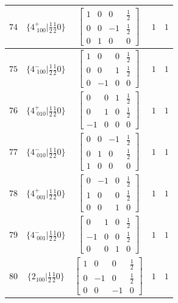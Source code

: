 \documentclass[fleqn,8pt]{jsarticle}
\begin{document}
\begin{longtable}{ccccc}
$ 74 $ & $ \{4^{+}_{\,\,100}|\frac{1}{2} \frac{1}{2} 0\} $ & $ \begin{bmatrix} 1 & 0 & 0 & \frac{1}{2} \\ 0 & 0 & -1 & \frac{1}{2} \\ 0 & 1 & 0 & 0 \end{bmatrix} $ & $ 1 $ & $ 1 $ \\ \hline
$ 75 $ & $ \{4^{-}_{\,\,100}|\frac{1}{2} \frac{1}{2} 0\} $ & $ \begin{bmatrix} 1 & 0 & 0 & \frac{1}{2} \\ 0 & 0 & 1 & \frac{1}{2} \\ 0 & -1 & 0 & 0 \end{bmatrix} $ & $ 1 $ & $ 1 $ \\ \hline
$ 76 $ & $ \{4^{+}_{\,\,010}|\frac{1}{2} \frac{1}{2} 0\} $ & $ \begin{bmatrix} 0 & 0 & 1 & \frac{1}{2} \\ 0 & 1 & 0 & \frac{1}{2} \\ -1 & 0 & 0 & 0 \end{bmatrix} $ & $ 1 $ & $ 1 $ \\ \hline
$ 77 $ & $ \{4^{-}_{\,\,010}|\frac{1}{2} \frac{1}{2} 0\} $ & $ \begin{bmatrix} 0 & 0 & -1 & \frac{1}{2} \\ 0 & 1 & 0 & \frac{1}{2} \\ 1 & 0 & 0 & 0 \end{bmatrix} $ & $ 1 $ & $ 1 $ \\ \hline
$ 78 $ & $ \{4^{+}_{\,\,001}|\frac{1}{2} \frac{1}{2} 0\} $ & $ \begin{bmatrix} 0 & -1 & 0 & \frac{1}{2} \\ 1 & 0 & 0 & \frac{1}{2} \\ 0 & 0 & 1 & 0 \end{bmatrix} $ & $ 1 $ & $ 1 $ \\ \hline
$ 79 $ & $ \{4^{-}_{\,\,001}|\frac{1}{2} \frac{1}{2} 0\} $ & $ \begin{bmatrix} 0 & 1 & 0 & \frac{1}{2} \\ -1 & 0 & 0 & \frac{1}{2} \\ 0 & 0 & 1 & 0 \end{bmatrix} $ & $ 1 $ & $ 1 $ \\ \hline
$ 80 $ & $ \{2{}_{100}|\frac{1}{2} \frac{1}{2} 0\} $ & $ \begin{bmatrix} 1 & 0 & 0 & \frac{1}{2} \\ 0 & -1 & 0 & \frac{1}{2} \\ 0 & 0 & -1 & 0 \end{bmatrix} $ & $ 1 $ & $ 1 $ \\ \hline

\end{longtable}
\end{document}
